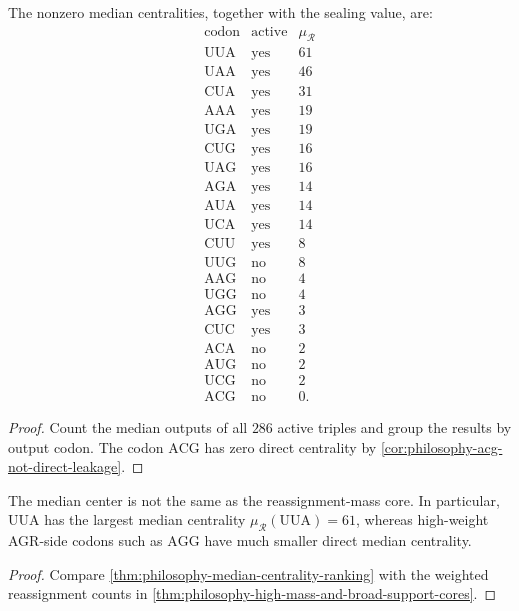 \begin{theorem}
\label{thm:philosophy-median-centrality-ranking}
The nonzero median centralities, together with the sealing value, are:
$$
\begin{array}{c|c|r}
  \text{codon} & \text{active} & \mu_{\mathcal{R}}\\
  \hline
  \mathrm{UUA} & \text{yes} & 61\\
  \mathrm{UAA} & \text{yes} & 46\\
  \mathrm{CUA} & \text{yes} & 31\\
  \mathrm{AAA} & \text{yes} & 19\\
  \mathrm{UGA} & \text{yes} & 19\\
  \mathrm{CUG} & \text{yes} & 16\\
  \mathrm{UAG} & \text{yes} & 16\\
  \mathrm{AGA} & \text{yes} & 14\\
  \mathrm{AUA} & \text{yes} & 14\\
  \mathrm{UCA} & \text{yes} & 14\\
  \mathrm{CUU} & \text{yes} & 8\\
  \mathrm{UUG} & \text{no} & 8\\
  \mathrm{AAG} & \text{no} & 4\\
  \mathrm{UGG} & \text{no} & 4\\
  \mathrm{AGG} & \text{yes} & 3\\
  \mathrm{CUC} & \text{yes} & 3\\
  \mathrm{ACA} & \text{no} & 2\\
  \mathrm{AUG} & \text{no} & 2\\
  \mathrm{UCG} & \text{no} & 2\\
  \mathrm{ACG} & \text{no} & 0.
\end{array}
$$
\end{theorem}
\begin{proof}
Count the median outputs of all $286$ active triples and group the
results by output codon. The codon $\mathrm{ACG}$ has zero direct
centrality by \autoref{cor:philosophy-acg-not-direct-leakage}.
\end{proof}

\begin{corollary}
\label{cor:philosophy-mass-core-median-center-differ}
The median center is not the same as the reassignment-mass core. In
particular, $\mathrm{UUA}$ has the largest median centrality
$\mu_{\mathcal{R}}(\mathrm{UUA})=61$, whereas high-weight AGR-side
codons such as $\mathrm{AGG}$ have much smaller direct median
centrality.
\end{corollary}
\begin{proof}
Compare \autoref{thm:philosophy-median-centrality-ranking} with the
weighted reassignment counts in
\autoref{thm:philosophy-high-mass-and-broad-support-cores}.
\end{proof}

